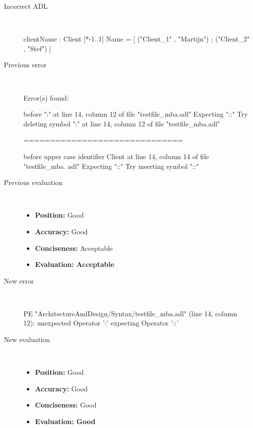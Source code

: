 \begin{description}
  \item[Incorrect ADL]~\\
\begin{adl}
clientName : Client [*-1..1] Name =
    [ ("Client_1"      , "Martijn")
    ; ("Client_2"      , "Stef")
    ]\end{adl}
  \item[Previous error]~\\
\begin{haskell}
Error(s) found:

before ":" at line 14, column 12 of file "testfile_mba.adl"
Expecting "::"
Try deleting symbol ":" at line 14, column 12 of file "testfile_mba.adl"

==============================

before upper case identifier Client at line 14, column 14 of file "testfile_mba.
adl"
Expecting "::"
Try inserting symbol "::"\end{haskell}
  \item[Previous evaluation]~\\
    \begin{itemize}
    \item \textbf{Position:} Good
    \item \textbf{Accuracy:} Good
    \item \textbf{Conciseness:} Acceptable
    \item \textbf{Evaluation: Acceptable}
    \end{itemize}
  \item[New error]~\\
\begin{haskell}
PE "ArchitectureAndDesign/Syntax/testfile_mba.adl" (line 14, column 12):
unexpected Operator ':'
expecting Operator '::'\end{haskell}
  \item[New evaluation]~\\
    \begin{itemize}
    \item \textbf{Position:} Good
    \item \textbf{Accuracy:} Good
    \item \textbf{Conciseness:} Good
    \item \textbf{Evaluation: Good}
    \end{itemize}
  \end{description}

\hrulefill

